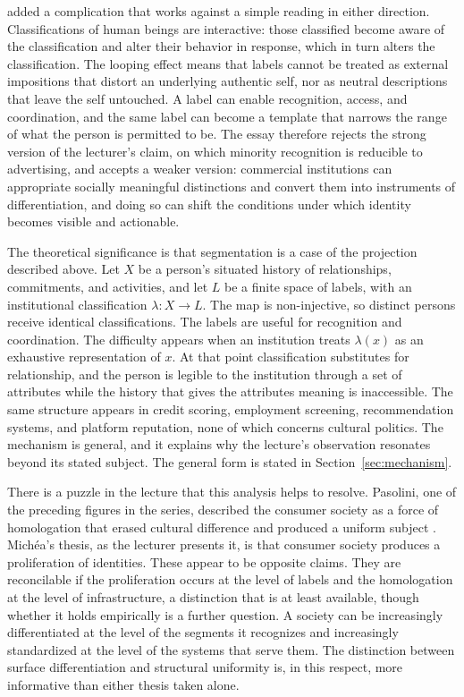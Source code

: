\documentclass[12pt]{article}
\begin{document}
\citet{hacking86,hacking95} added a complication that works against a simple reading in either direction. Classifications of human beings are interactive: those classified become aware of the classification and alter their behavior in response, which in turn alters the classification. The looping effect means that labels cannot be treated as external impositions that distort an underlying authentic self, nor as neutral descriptions that leave the self untouched. A label can enable recognition, access, and coordination, and the same label can become a template that narrows the range of what the person is permitted to be. The essay therefore rejects the strong version of the lecturer's claim, on which minority recognition is reducible to advertising, and accepts a weaker version: commercial institutions can appropriate socially meaningful distinctions and convert them into instruments of differentiation, and doing so can shift the conditions under which identity becomes visible and actionable.

The theoretical significance is that segmentation is a case of the projection described above. Let $X$ be a person's situated history of relationships, commitments, and activities, and let $L$ be a finite space of labels, with an institutional classification $\lambda:X\to L$. The map is non-injective, so distinct persons receive identical classifications. The labels are useful for recognition and coordination. The difficulty appears when an institution treats $\lambda(x)$ as an exhaustive representation of $x$. At that point classification substitutes for relationship, and the person is legible to the institution through a set of attributes while the history that gives the attributes meaning is inaccessible. The same structure appears in credit scoring, employment screening, recommendation systems, and platform reputation, none of which concerns cultural politics. The mechanism is general, and it explains why the lecture's observation resonates beyond its stated subject. The general form is stated in Section~\ref{sec:mechanism}.

There is a puzzle in the lecture that this analysis helps to resolve. Pasolini, one of the preceding figures in the series, described the consumer society as a force of homologation that erased cultural difference and produced a uniform subject \citep{pasolini}. Michéa's thesis, as the lecturer presents it, is that consumer society produces a proliferation of identities. These appear to be opposite claims. They are reconcilable if the proliferation occurs at the level of labels and the homologation at the level of infrastructure, a distinction that is at least available, though whether it holds empirically is a further question. A society can be increasingly differentiated at the level of the segments it recognizes and increasingly standardized at the level of the systems that serve them. The distinction between surface differentiation and structural uniformity is, in this respect, more informative than either thesis taken alone.
\end{document}
